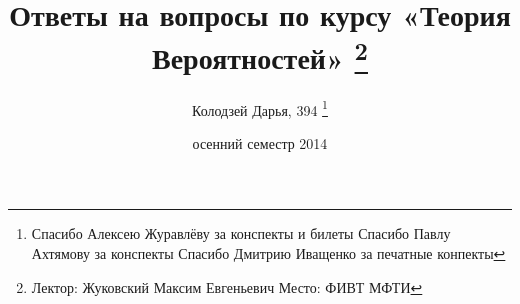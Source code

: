 \documentclass[russian, twoside, 12pt, a5paper]{article}
\begin{document}
\title{Ответы на вопросы по курсу «Теория Вероятностей»
	\thanks{Лектор: Жуковский Максим Евгеньевич\endgraf
	       	Место: ФИВТ МФТИ}
}

\author{Колодзей Дарья, 394
	\thanks{
		Спасибо Алексею Журавлёву за конспекты и билеты\endgraf
		Спасибо Павлу Ахтямову за конспекты\endgraf
		Спасибо Дмитрию Иващенко за печатные конпекты
		}}

\date{осенний семестр 2014}

\maketitle
\tableofcontents



\end{document}
